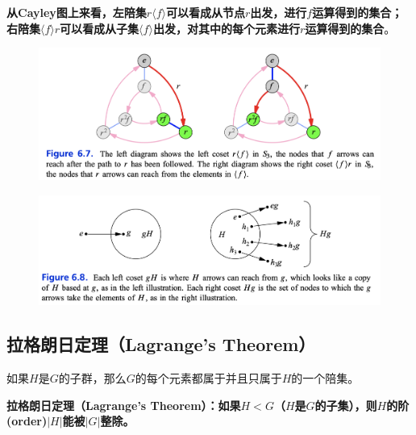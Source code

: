 \documentclass[12pt]{article}
\begin{document}
\textbf{从Cayley图上来看，左陪集$r \langle f \rangle $可以看成从节点$r$出发，进行$f$运算得到的集合；右陪集$\langle f \rangle r$可以看成从子集$\langle f \rangle $出发，对其中的每个元素进行$r$运算得到的集合}。
\begin{figure}[H]
    \centering
    \includegraphics[width=1\textwidth]{fig/Group/Cayley-Left-Right-Cosets.png}
\end{figure}
\begin{figure}[H]
    \centering
    \includegraphics[width=1\textwidth]{fig/Group/Compare-Left-Right-Cosets.png}
\end{figure}

\subsection{拉格朗日定理（Lagrange's Theorem）}
如果$H$是$G$的子群，那么$G$的每个元素都属于并且只属于$H$的一个陪集。

\begin{mdframed}[
linecolor=black!40,outerlinewidth=1pt,roundcorner=.5em,innertopmargin=1ex,innerbottommargin=.5\baselineskip,innerrightmargin=1em,innerleftmargin=1em,backgroundcolor=gray!5,
]
\textbf{
拉格朗日定理（Lagrange's Theorem）：如果$H < G$（$H$是$G$的子集），则$H$的阶(order)$|H|$能被$|G|$整除。
}
\end{mdframed}
\end{document}
